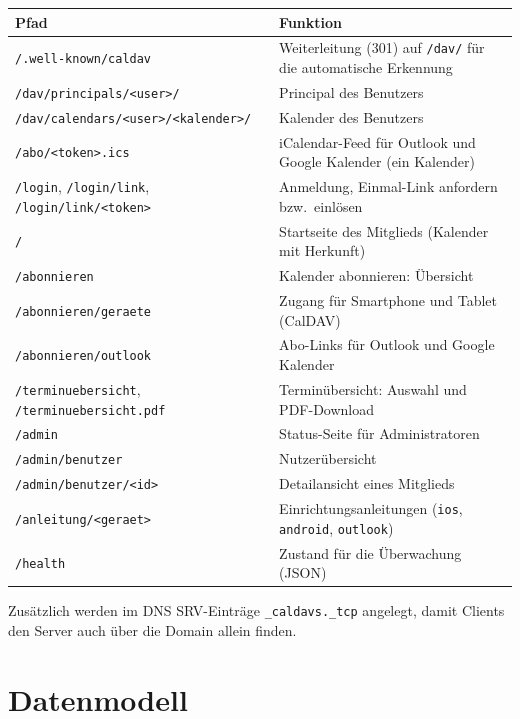 \documentclass[a4paper,fontsize=10pt]{scrartcl}
\newcommand{\code}[1]{\texttt{#1}}
\begin{document}
\begin{center}
\begin{tabularx}{\textwidth}{L{6.9cm}X}
\toprule
\textbf{Pfad} & \textbf{Funktion} \\
\midrule
\code{/.well-known/caldav} & Weiterleitung (301) auf \code{/dav/} für die
                             automatische Erkennung \\
\code{/dav/principals/<user>/} & Principal des Benutzers \\
\code{/dav/calendars/<user>/<kalender>/} & Kalender des Benutzers \\
\code{/abo/<token>.ics} & iCalendar-Feed für Outlook und Google Kalender
                          (ein Kalender) \\
\code{/login}, \code{/login/link}, \code{/login/link/<token>} & Anmeldung,
                          Einmal-Link anfordern bzw.\ einlösen \\
\code{/} & Startseite des Mitglieds (Kalender mit Herkunft) \\
\code{/abonnieren} & Kalender abonnieren: Übersicht \\
\code{/abonnieren/geraete} & Zugang für Smartphone und Tablet (CalDAV) \\
\code{/abonnieren/outlook} & Abo-Links für Outlook und Google Kalender \\
\code{/terminuebersicht}, \code{/terminuebersicht.pdf} & Terminübersicht:
                          Auswahl und PDF-Download \\
\code{/admin} & Status-Seite für Administratoren \\
\code{/admin/benutzer} & Nutzerübersicht \\
\code{/admin/benutzer/<id>} & Detailansicht eines Mitglieds \\
\code{/anleitung/<geraet>} & Einrichtungsanleitungen (\code{ios}, \code{android}, \code{outlook}) \\
\code{/health} & Zustand für die Überwachung (JSON) \\
\bottomrule
\end{tabularx}
\end{center}

Zusätzlich werden im DNS SRV-Einträge \code{\_caldavs.\_tcp} angelegt, damit
Clients den Server auch über die Domain allein finden.

\section{Datenmodell}
\end{document}
